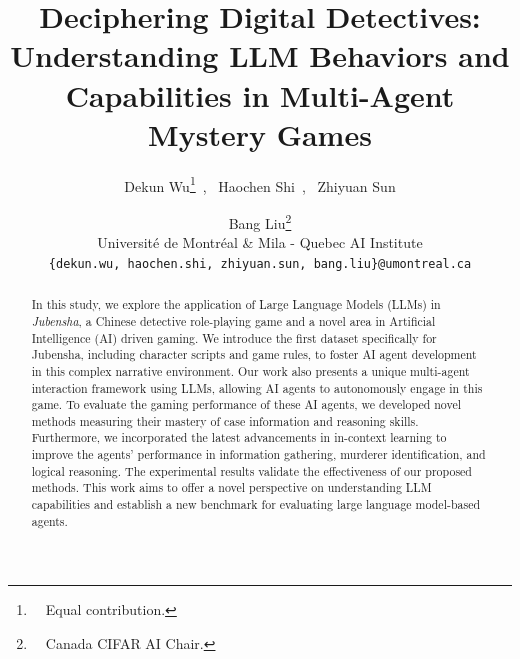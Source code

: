 \documentclass[11pt]{article}
\title{Deciphering Digital Detectives: Understanding LLM Behaviors and Capabilities in Multi-Agent Mystery Games}
\author{Dekun Wu\thanks{\ \ Equal contribution.}\ , \ Haochen Shi\footnotemark[1] \ , \ Zhiyuan Sun \and Bang Liu\thanks{\ \ Canada CIFAR AI Chair.}\\
        Université de Montréal \& Mila - Quebec AI Institute \\ 
        \texttt{\{dekun.wu, haochen.shi, zhiyuan.sun, bang.liu\}@umontreal.ca} \\ }
\begin{document}
\maketitle
\begin{abstract}
In this study, we explore the application of Large Language Models (LLMs) in \textit{Jubensha}, a Chinese detective role-playing game and a novel area in Artificial Intelligence (AI) driven gaming. We introduce the first dataset specifically for Jubensha, including character scripts and game rules, to foster AI agent development in this complex narrative environment. Our work also presents a unique multi-agent interaction framework using LLMs, allowing AI agents to autonomously engage in this game. To evaluate the gaming performance of these AI agents, we developed novel methods measuring their mastery of case information and reasoning skills. Furthermore, we incorporated the latest advancements in in-context learning to improve the agents' performance in information gathering, murderer identification, and logical reasoning. The experimental results validate the effectiveness of our proposed methods. This work aims to offer a novel perspective on understanding LLM capabilities and establish a new benchmark for evaluating large language model-based agents.


\end{abstract}
\end{document}
